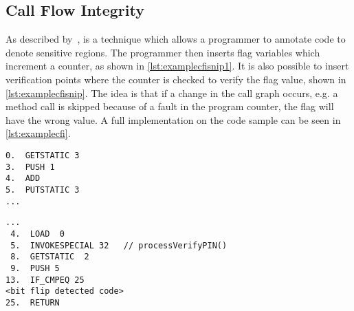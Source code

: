 \subsection{Call Flow Integrity} 
As described by~\cite{agl}, is a technique which allows a programmer to annotate code to denote sensitive regions. The programmer then inserts flag variables which increment a counter, as shown in \cref{lst:examplecfisnip1}. It is also possible to insert verification points where the counter is checked to verify the flag value, shown in \cref{lst:examplecfisnip}. The idea is that if a change in the call graph occurs, e.g. a method call is skipped because of a fault in the program counter, the flag will have the wrong value. A full implementation on the code sample can be seen in \cref{lst:examplecfi}.

\begin{lstlisting}[caption={Java code example of the control flow integrity countermeasure incrementing the control flow flag.},label={lst:examplecfisnip1}]
0.  GETSTATIC 3
3.  PUSH 1
4.  ADD
5.  PUTSTATIC 3
...
\end{lstlisting}

\begin{lstlisting}[caption={Java code example of the control flow integrity countermeasure checking the control flow flag.},label={lst:examplecfisnip}]
...
 4.  LOAD  0
 5.  INVOKESPECIAL 32   // processVerifyPIN()
 8.  GETSTATIC  2
 9.  PUSH 5
13.  IF_CMPEQ 25
<bit flip detected code>
25.  RETURN
\end{lstlisting}



